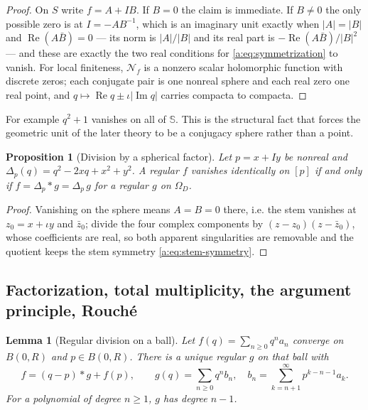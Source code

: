 \documentclass[11pt,a4paper]{article}
\numberwithin{equation}{section}
\newtheorem{proposition}[theorem]{Proposition}
\newtheorem{lemma}[theorem]{Lemma}
\theoremstyle{definition}
\theoremstyle{remark}
\theoremstyle{plain}
\newcommand{\SSS}{\mathbb S}
\DeclareMathOperator{\Rea}{Re}
\DeclareMathOperator{\Ima}{Im}
\newcommand{\Om}{\Omega}
\newcommand{\abs}[1]{\lvert #1\rvert}
\begin{document}
\begin{proof}
On $S$ write $f=A+IB$. If $B=0$ the claim is immediate. If $B\ne0$ the only
possible zero is at $I=-AB^{-1}$, which is an imaginary unit exactly when
$\abs A=\abs B$ and $\Rea(A\bar B)=0$ --- its norm is $\abs A/\abs B$ and its
real part is $-\Rea(A\bar B)/\abs B^2$ --- and these are exactly the two real
conditions for \eqref{a:eq:symmetrization} to vanish. For local finiteness,
$\mathcal N_f$ is a nonzero scalar holomorphic function with discrete zeros;
each conjugate pair is one nonreal sphere and each real zero one real point,
and $q\mapsto\Rea q\pm\iota\abs{\Ima q}$ carries compacta to compacta.
\end{proof}

For example $q^2+1$ vanishes on all of $\SSS$. This is the structural fact
that forces the geometric unit of the later theory to be a conjugacy sphere
rather than a point.

\begin{proposition}[Division by a spherical factor]
\label{a:prop:spherical-division}
Let $p=x+Iy$ be nonreal and $\Delta_p(q)=q^2-2xq+x^2+y^2$. A regular $f$
vanishes identically on $[p]$ if and only if $f=\Delta_p*g=\Delta_p\,g$ for a
regular $g$ on $\Om_D$.
\end{proposition}

\begin{proof}
Vanishing on the sphere means $A=B=0$ there, i.e. the stem vanishes at
$z_0=x+\iota y$ and $\bar z_0$; divide the four complex components by
$(z-z_0)(z-\bar z_0)$, whose coefficients are real, so both apparent
singularities are removable and the quotient keeps the stem symmetry
\eqref{a:eq:stem-symmetry}.
\end{proof}

\subsection{Factorization, total multiplicity, the argument principle, Rouch\'e}
\label{a:sec:counting}

\begin{lemma}[Regular division on a ball]
\label{a:lem:division}
Let $f(q)=\sum_{n\ge0}q^na_n$ converge on $B(0,R)$ and $p\in B(0,R)$. There is
a unique regular $g$ on that ball with
\begin{equation}
 f=(q-p)*g+f(p),\qquad
 g(q)=\sum_{n\ge0}q^nb_n,\quad b_n=\sum_{k=n+1}^{\infty}p^{k-n-1}a_k .
 \label{a:eq:division}
\end{equation}
For a polynomial of degree $n\ge1$, $g$ has degree $n-1$.
\end{lemma}
\end{document}
